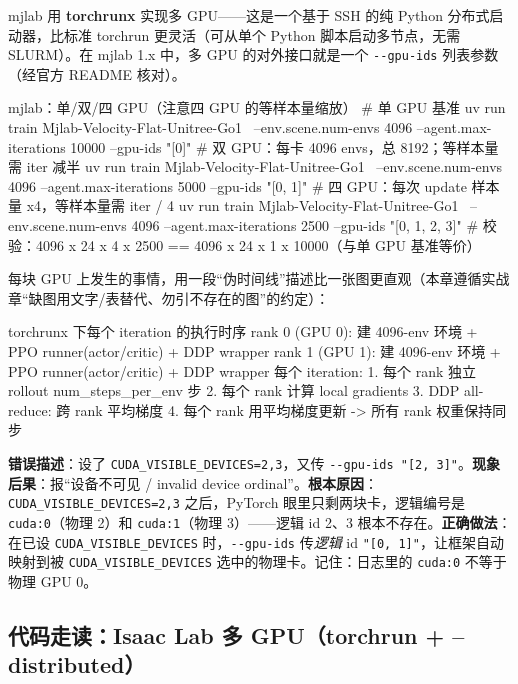 mjlab 用 \textbf{torchrunx} 实现多 GPU——这是一个基于 SSH 的纯 Python 分布式启动器，比标准 torchrun 更灵活（可从单个 Python 脚本启动多节点，无需 SLURM）\cite{schwarke2025rslrl}。在 mjlab 1.x 中，多 GPU 的对外接口就是一个 \verb|--gpu-ids| 列表参数（经官方 README 核对）。

\begin{codebox}[bash]{mjlab：单/双/四 GPU（注意四 GPU 的等样本量缩放）}
# 单 GPU 基准
uv run train Mjlab-Velocity-Flat-Unitree-Go1 \
    --env.scene.num-envs 4096 --agent.max-iterations 10000 --gpu-ids "[0]"
# 双 GPU：每卡 4096 envs，总 8192；等样本量需 iter 减半
uv run train Mjlab-Velocity-Flat-Unitree-Go1 \
    --env.scene.num-envs 4096 --agent.max-iterations 5000  --gpu-ids "[0, 1]"
# 四 GPU：每次 update 样本量 x4，等样本量需 iter / 4
uv run train Mjlab-Velocity-Flat-Unitree-Go1 \
    --env.scene.num-envs 4096 --agent.max-iterations 2500  --gpu-ids "[0, 1, 2, 3]"
# 校验：4096 x 24 x 4 x 2500 == 4096 x 24 x 1 x 10000（与单 GPU 基准等价）
\end{codebox}

每块 GPU 上发生的事情，用一段“伪时间线”描述比一张图更直观（本章遵循实战章“缺图用文字/表替代、勿引不存在的图”的约定）：

\begin{codebox}[text]{torchrunx 下每个 iteration 的执行时序}
rank 0 (GPU 0): 建 4096-env 环境 + PPO runner(actor/critic) + DDP wrapper
rank 1 (GPU 1): 建 4096-env 环境 + PPO runner(actor/critic) + DDP wrapper
每个 iteration:
  1. 每个 rank 独立 rollout num_steps_per_env 步
  2. 每个 rank 计算 local gradients
  3. DDP all-reduce: 跨 rank 平均梯度
  4. 每个 rank 用平均梯度更新 -> 所有 rank 权重保持同步
\end{codebox}

\begin{pitfall}[\texttt{CUDA\_VISIBLE\_DEVICES} 与 \texttt{--gpu-ids} 的双重映射撞车]
\textbf{错误描述}：设了 \verb|CUDA_VISIBLE_DEVICES=2,3|，又传 \verb|--gpu-ids "[2, 3]"|。\textbf{现象后果}：报“设备不可见 / invalid device ordinal”。\textbf{根本原因}：\verb|CUDA_VISIBLE_DEVICES=2,3| 之后，PyTorch 眼里只剩两块卡，逻辑编号是 \verb|cuda:0|（物理 2）和 \verb|cuda:1|（物理 3）——逻辑 id 2、3 根本不存在。\textbf{正确做法}：在已设 \verb|CUDA_VISIBLE_DEVICES| 时，\verb|--gpu-ids| 传\emph{逻辑} id \verb|"[0, 1]"|，让框架自动映射到被 \verb|CUDA_VISIBLE_DEVICES| 选中的物理卡。记住：日志里的 \verb|cuda:0| 不等于物理 GPU 0。
\end{pitfall}

\subsection{代码走读：Isaac Lab 多 GPU（torchrun + --distributed）}
\label{sec:rlmc-ls-isaac-multigpu}


